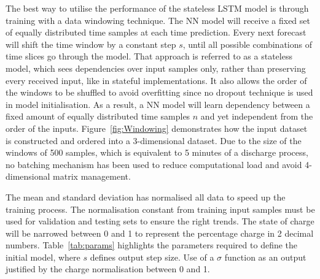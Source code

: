 %
%
The best way to utilise the performance of the stateless LSTM model is through training with a data windowing technique.
The NN model will receive a fixed set of equally distributed time samples at each time prediction.
Every next forecast will shift the time window by a constant step $s$, until all possible combinations of time slices go through the model.
That approach is referred to as a stateless model, which sees dependencies over input samples only, rather than preserving every received input, like in stateful implementations.
It also allows the order of the windows to be shuffled to avoid overfitting since no dropout technique is used in model initialisation.
As a result, a NN model will learn dependency between a fixed amount of equally distributed time samples $n$ and yet independent from the order of the inputs.
\mbox{Figure~\ref{fig:Windowing}} demonstrates how the input dataset is constructed and ordered into a 3-dimensional dataset.
Due to the size of the windows of 500 samples, which is equivalent to 5 minutes of a discharge process, no batching mechanism has been used to reduce computational load and avoid 4-dimensional matrix management.


%
%
The mean and standard deviation has normalised all data to speed up the training process.
The normalisation constant from training input samples must be used for validation and testing sets to ensure the right trends.
The state of charge will be narrowed between 0 and 1 to represent the percentage charge in 2 decimal numbers.
\mbox{Table~\ref{tab:params}} highlights the parameters required to define the initial model, where $s$ defines output step size.
Use of a $\sigma$ function as an output justified by the charge normalisation between 0 and 1.
\begin{table}[ht]
    \renewcommand{\arraystretch}{1.3}
    \caption{Model structure and parameters}
    \centering
    \label{tab:params}
\end{table}

